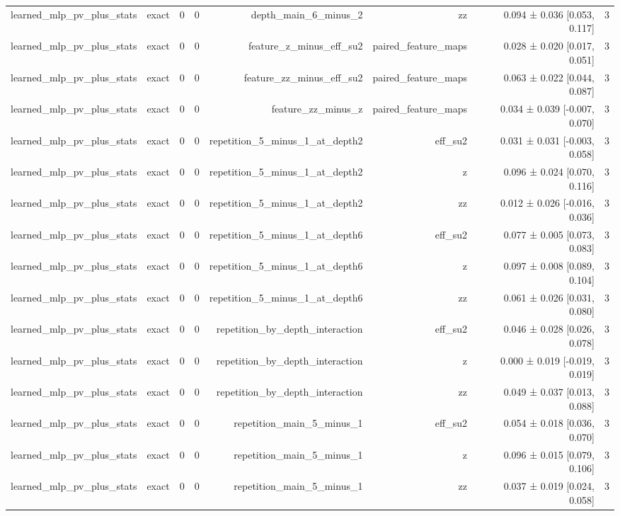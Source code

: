 \begin{table}
\begin{tabular}{lrrrrrrr}
learned\_mlp\_pv\_plus\_stats & exact & 0 & 0 & depth\_main\_6\_minus\_2 & zz & 0.094 ± 0.036 [0.053, 0.117] & 3 \\
learned\_mlp\_pv\_plus\_stats & exact & 0 & 0 & feature\_z\_minus\_eff\_su2 & paired\_feature\_maps & 0.028 ± 0.020 [0.017, 0.051] & 3 \\
learned\_mlp\_pv\_plus\_stats & exact & 0 & 0 & feature\_zz\_minus\_eff\_su2 & paired\_feature\_maps & 0.063 ± 0.022 [0.044, 0.087] & 3 \\
learned\_mlp\_pv\_plus\_stats & exact & 0 & 0 & feature\_zz\_minus\_z & paired\_feature\_maps & 0.034 ± 0.039 [-0.007, 0.070] & 3 \\
learned\_mlp\_pv\_plus\_stats & exact & 0 & 0 & repetition\_5\_minus\_1\_at\_depth2 & eff\_su2 & 0.031 ± 0.031 [-0.003, 0.058] & 3 \\
learned\_mlp\_pv\_plus\_stats & exact & 0 & 0 & repetition\_5\_minus\_1\_at\_depth2 & z & 0.096 ± 0.024 [0.070, 0.116] & 3 \\
learned\_mlp\_pv\_plus\_stats & exact & 0 & 0 & repetition\_5\_minus\_1\_at\_depth2 & zz & 0.012 ± 0.026 [-0.016, 0.036] & 3 \\
learned\_mlp\_pv\_plus\_stats & exact & 0 & 0 & repetition\_5\_minus\_1\_at\_depth6 & eff\_su2 & 0.077 ± 0.005 [0.073, 0.083] & 3 \\
learned\_mlp\_pv\_plus\_stats & exact & 0 & 0 & repetition\_5\_minus\_1\_at\_depth6 & z & 0.097 ± 0.008 [0.089, 0.104] & 3 \\
learned\_mlp\_pv\_plus\_stats & exact & 0 & 0 & repetition\_5\_minus\_1\_at\_depth6 & zz & 0.061 ± 0.026 [0.031, 0.080] & 3 \\
learned\_mlp\_pv\_plus\_stats & exact & 0 & 0 & repetition\_by\_depth\_interaction & eff\_su2 & 0.046 ± 0.028 [0.026, 0.078] & 3 \\
learned\_mlp\_pv\_plus\_stats & exact & 0 & 0 & repetition\_by\_depth\_interaction & z & 0.000 ± 0.019 [-0.019, 0.019] & 3 \\
learned\_mlp\_pv\_plus\_stats & exact & 0 & 0 & repetition\_by\_depth\_interaction & zz & 0.049 ± 0.037 [0.013, 0.088] & 3 \\
learned\_mlp\_pv\_plus\_stats & exact & 0 & 0 & repetition\_main\_5\_minus\_1 & eff\_su2 & 0.054 ± 0.018 [0.036, 0.070] & 3 \\
learned\_mlp\_pv\_plus\_stats & exact & 0 & 0 & repetition\_main\_5\_minus\_1 & z & 0.096 ± 0.015 [0.079, 0.106] & 3 \\
learned\_mlp\_pv\_plus\_stats & exact & 0 & 0 & repetition\_main\_5\_minus\_1 & zz & 0.037 ± 0.019 [0.024, 0.058] & 3 \\

\end{tabular}
\end{table}
